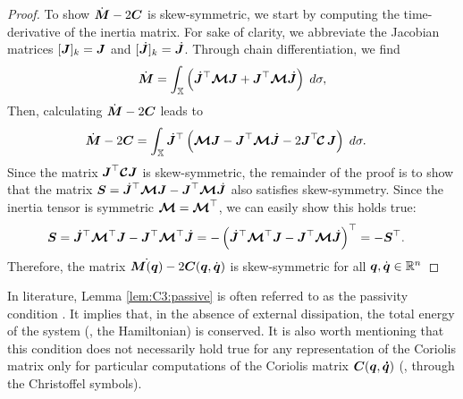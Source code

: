 \begin{proof}
To show $\dot{\boldsymbol{M}} - 2\boldsymbol{C}$ is skew-symmetric, we start by computing the time-derivative of the inertia matrix. For sake of clarity, we abbreviate the Jacobian matrices $[\boldsymbol{J}]_k = \boldsymbol{J}$ and $[\,\,\dot{\!\!\boldsymbol{J}}]_k = \,\,\dot{\!\!\boldsymbol{J}}$. Through chain differentiation, we find
%
\begin{equation}
\dot{\boldsymbol{M}} = \int_{\mathbb{X}} \left(\,\,\dot{\!\!\boldsymbol{J}}^\top \boldsymbol{\mathcal{M}} \boldsymbol{J} + \boldsymbol{J}^\top \boldsymbol{\mathcal{M}} \,\,\dot{\!\!\boldsymbol{J}} 
\right)\; d \sigma,
\end{equation}
%
Then, calculating $\dot{\boldsymbol{M}} - 2\boldsymbol{C}$ leads to
%
\begin{align}
\dot{\boldsymbol{M}} - 2\boldsymbol{C} & = \int_{\mathbb{X}} \,\,\dot{\!\!\boldsymbol{J}}^\top \left( \boldsymbol{\mathcal{M}} \boldsymbol{J} - \boldsymbol{J}^\top \boldsymbol{\mathcal{M}} \,\,\dot{\!\!\boldsymbol{J}} - 2\boldsymbol{J}^\top \!\boldsymbol{\mathcal{C}} \, \boldsymbol{J} \right) \; d\sigma.
\end{align}
%
Since the matrix $\boldsymbol{J}^\top \boldsymbol{\mathcal{C}} \boldsymbol{J}$ is skew-symmetric, the remainder of the proof is to show that the matrix $\boldsymbol{S} = \,\,\dot{\!\!\boldsymbol{J}}^\top \boldsymbol{\mathcal{M}} \boldsymbol{J} - \boldsymbol{J}^\top \boldsymbol{\mathcal{M}} \,\,\dot{\!\!\boldsymbol{J}}$ also satisfies skew-symmetry. Since the inertia tensor is symmetric $\boldsymbol{\mathcal{M}} = \boldsymbol{\mathcal{M}}^\top
$, we can easily show this holds true:
%
\begin{align}
\mat{S} & = \dJB^\top \MT^\top \mat{J} - \mat{J}^\top \MT^\top \dJB = -\left(\dJB^\top \ten{M}^\top \mat{J} - \mat{J}^\top \ten{M} \dJB \right)^\top = -\mat{S}^\top.
\end{align}
%
Therefore, the matrix $\dot{\boldsymbol{M}(\boldsymbol{q})} - 2\boldsymbol{C}(\boldsymbol{q},\dot{\boldsymbol{q}})$ is skew-symmetric for all $\boldsymbol{q},\dot{\boldsymbol{q}} \in \mathbb{R}^n$
\end{proof}

In literature, Lemma \ref{lem:C3:passive} is often referred to as the passivity condition \cite{Spong2006,Ortega1998,Murray1994}. It implies that, in the absence of external dissipation, the total energy of the system (\ie, the Hamiltonian) is conserved.
It is also worth mentioning that this condition does not necessarily hold true for any representation of the Coriolis matrix only for particular computations of the Coriolis matrix $\boldsymbol{C}(\boldsymbol{q},\boldsymbol{\dot{q}})$ (\eg, through the Christoffel symbols).

